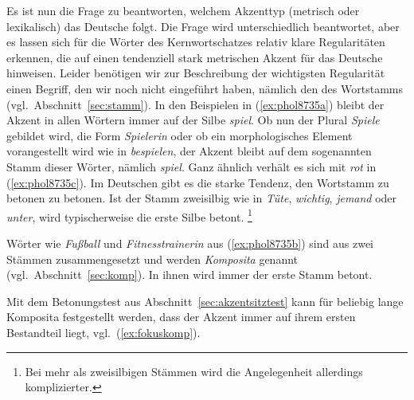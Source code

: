 Es ist nun die Frage zu beantworten, welchem Akzenttyp (metrisch oder lexikalisch) das Deutsche folgt.
Die Frage wird unterschiedlich beantwortet, aber es lassen sich für die Wörter des Kernwortschatzes relativ klare Regularitäten erkennen, die auf einen tendenziell stark metrischen Akzent für das Deutsche hinweisen.
Leider benötigen wir zur Beschreibung der wichtigsten Regularität einen Begriff, den wir noch nicht eingeführt haben, nämlich den des \label{abs:3453457}Wortstamms (vgl.\ Abschnitt~\ref{sec:stamm}).
In den Beispielen in (\ref{ex:phol8735a}) bleibt der Akzent in allen Wörtern immer auf der Silbe \textit{spiel}.
Ob nun der Plural \textit{Spiele} gebildet wird, die Form \textit{Spielerin} oder ob ein morphologisches Element vorangestellt wird wie in \textit{bespielen}, der Akzent bleibt auf dem sogenannten Stamm dieser Wörter, nämlich \textit{spiel}.
Ganz ähnlich verhält es sich mit \textit{rot} in (\ref{ex:phol8735c}).
Im Deutschen gibt es die starke Tendenz, den Wortstamm zu betonen zu betonen.
Ist der Stamm zweisilbig wie in \textit{Tüte}, \textit{wichtig}, \textit{jemand} oder \textit{unter}, wird typischerweise die erste Silbe betont.%
\footnote{Bei mehr als zweisilbigen Stämmen wird die Angelegenheit allerdings komplizierter.}


Wörter wie \textit{Fußball} und \textit{Fitnesstrainerin} aus (\ref{ex:phol8735b}) sind aus zwei Stämmen zusammengesetzt und werden \textit{Komposita} genannt (vgl.\ Abschnitt~\ref{sec:komp}).
In ihnen wird immer der erste Stamm betont.


Mit dem Betonungstest aus Abschnitt~\ref{sec:akzentsitztest} kann für beliebig lange Komposita festgestellt werden, dass der Akzent immer auf ihrem ersten Bestandteil liegt, vgl.\ (\ref{ex:fokuskomp}).

\begin{exe}
  \ex\label{ex:fokuskomp}
  \begin{xlist}
  \end{xlist}
\end{exe}

